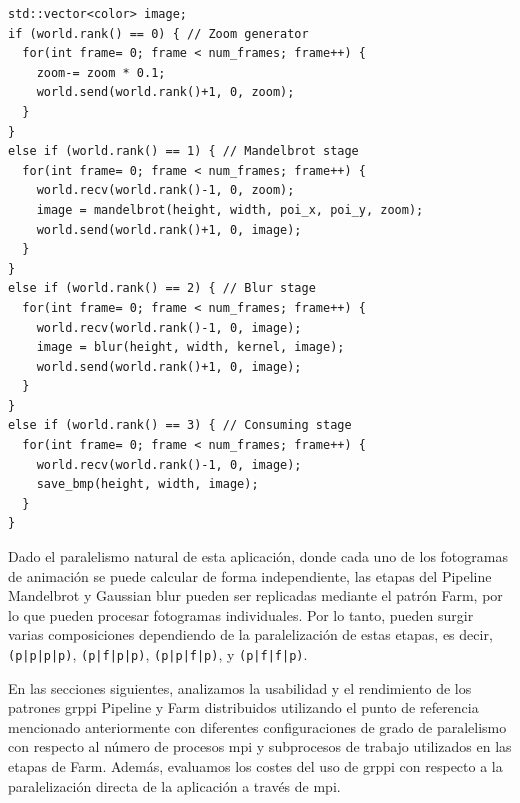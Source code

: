 \vspace{0.35cm}
\begin{lstlisting}[linewidth=1\columnwidth,caption={Implementación Mandelbrot en \acrshort{grppi} \acrshort{mpi}.},label=lst:grppimandelcode,frame=single]
std::vector<color> image;
if (world.rank() == 0) { // Zoom generator
  for(int frame= 0; frame < num_frames; frame++) {
    zoom-= zoom * 0.1;
    world.send(world.rank()+1, 0, zoom);
  }
}
else if (world.rank() == 1) { // Mandelbrot stage
  for(int frame= 0; frame < num_frames; frame++) {
    world.recv(world.rank()-1, 0, zoom);
    image = mandelbrot(height, width, poi_x, poi_y, zoom);
    world.send(world.rank()+1, 0, image);
  }
}
else if (world.rank() == 2) { // Blur stage
  for(int frame= 0; frame < num_frames; frame++) {
    world.recv(world.rank()-1, 0, image);
    image = blur(height, width, kernel, image);
    world.send(world.rank()+1, 0, image);
  }
} 
else if (world.rank() == 3) { // Consuming stage
  for(int frame= 0; frame < num_frames; frame++) {
    world.recv(world.rank()-1, 0, image);
    save_bmp(height, width, image);
  }
}
\end{lstlisting}
\vspace{0.35cm}

Dado el paralelismo natural de esta aplicación, donde cada uno de los fotogramas de animación se puede calcular de forma independiente, las etapas del Pipeline Mandelbrot y Gaussian blur pueden ser replicadas mediante el patrón Farm, por lo que pueden procesar fotogramas individuales. Por lo tanto, pueden surgir varias composiciones dependiendo de la paralelización de estas etapas, es decir, \texttt{(p|p|p|p)}, \texttt{(p|f|p|p)}, \texttt{(p|p|f|p)}, y \texttt{(p|f|f|p)}.


En las secciones siguientes, analizamos la usabilidad y el rendimiento de los patrones \acrshort{grppi} Pipeline y Farm distribuidos utilizando el punto de referencia mencionado anteriormente con diferentes configuraciones de grado de paralelismo con respecto al número de procesos \acrshort{mpi} y subprocesos de trabajo utilizados en las etapas de Farm. Además, evaluamos los costes del uso de \acrshort{grppi} con respecto a la paralelización directa de la aplicación a través de \acrshort{mpi}.

